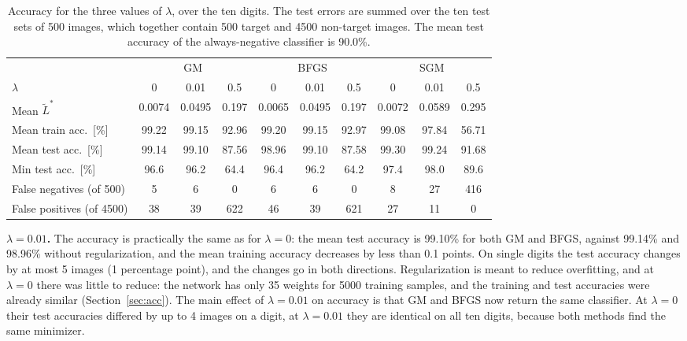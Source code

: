 \begin{table}[h]
\centering
\small
\setlength{\tabcolsep}{4pt}
\begin{tabular}{l ccc ccc ccc}
\toprule
 & \multicolumn{3}{c}{GM} & \multicolumn{3}{c}{BFGS} & \multicolumn{3}{c}{SGM} \\
\cmidrule(lr){2-4}\cmidrule(lr){5-7}\cmidrule(lr){8-10}
$\lambda$ & 0 & 0.01 & 0.5 & 0 & 0.01 & 0.5 & 0 & 0.01 & 0.5 \\
\midrule
Mean $\tilde L^*$ & 0.0074 & 0.0495 & 0.197 & 0.0065 & 0.0495 & 0.197 & 0.0072 & 0.0589 & 0.295 \\
Mean train acc.\ [\%] & 99.22 & 99.15 & 92.96 & 99.20 & 99.15 & 92.97 & 99.08 & 97.84 & 56.71 \\
Mean test acc.\ [\%] & 99.14 & 99.10 & 87.56 & 98.96 & 99.10 & 87.58 & 99.30 & 99.24 & 91.68 \\
Min test acc.\ [\%] & 96.6 & 96.2 & 64.4 & 96.4 & 96.2 & 64.2 & 97.4 & 98.0 & 89.6 \\
False negatives (of 500) & 5 & 6 & 0 & 6 & 6 & 0 & 8 & 27 & 416 \\
False positives (of 4500) & 38 & 39 & 622 & 46 & 39 & 621 & 27 & 11 & 0 \\
\bottomrule
\end{tabular}
\caption{Accuracy for the three values of $\lambda$, over the ten digits. The test errors are summed over the ten test sets of 500 images, which together contain 500 target and 4500 non-target images. The mean test accuracy of the always-negative classifier is 90.0\%.}
\label{tab:acclambda}
\end{table}

\textbf{$\lambda=0.01$.} The accuracy is practically the same as for $\lambda=0$: the mean test accuracy is 99.10\% for both GM and BFGS, against 99.14\% and 98.96\% without regularization, and the mean training accuracy decreases by less than 0.1 points. On single digits the test accuracy changes by at most 5 images (1 percentage point), and the changes go in both directions. Regularization is meant to reduce overfitting, and at $\lambda=0$ there was little to reduce: the network has only 35 weights for 5000 training samples, and the training and test accuracies were already similar (Section~\ref{sec:acc}). The main effect of $\lambda=0.01$ on accuracy is that GM and BFGS now return the same classifier. At $\lambda=0$ their test accuracies differed by up to 4 images on a digit, at $\lambda=0.01$ they are identical on all ten digits, because both methods find the same minimizer.

